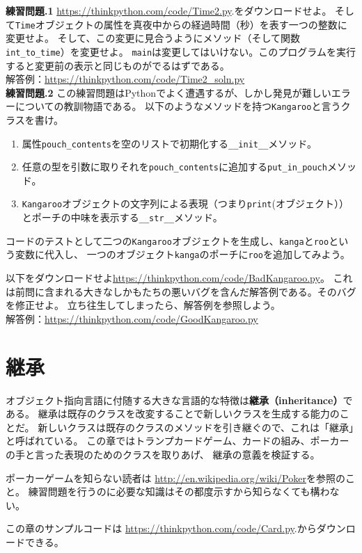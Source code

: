 \documentclass[a4j,12pt,makeidx]{jbook}
\newcommand{\tp}{\thechapter}
\begin{document}
\noindent
{\bf 練習問題\tp.1} \url{https://thinkpython.com/code/Time2.py}.をダウンロードせよ。
そして{\tt Time}オブジェクトの属性を真夜中からの経過時間（秒）を表す一つの整数に変更せよ。
そして、この変更に見合うようにメソッド（そして関数{\tt int\_to\_time}）を変更せよ。
{\tt main}は変更してはいけない。このプログラムを実行すると変更前の表示と同じものがでるはずである。 \\
解答例：\url{https://thinkpython.com/code/Time2_soln.py} \\

\noindent
{\bf 練習問題\tp.2} この練習問題はPythonでよく遭遇するが、しかし発見が難しいエラーについての教訓物語である。
以下のようなメソッドを持つ{\tt Kangaroo}と言うクラスを書け。
\begin{enumerate}
\item 属性{\tt pouch\_contents}を空のリストで初期化する{\verb"__init__"}メソッド。
\item 任意の型を引数に取りそれを{\tt pouch\_contents}に追加する{\tt put\_in\_pouch}メソッド。
\item {\tt Kangaroo}オブジェクトの文字列による表現（つまり{\tt print}(オブジェクト））とポーチの中味を表示する{\verb"__str__"}メソッド。
\end{enumerate}
コードのテストとして二つの{\tt Kangaroo}オブジェクトを生成し、{\tt kanga}と{\tt roo}という変数に代入し、
一つのオブジェクト{\tt kanga}のポーチに{\tt roo}を追加してみよう。\par
以下をダウンロードせよ\url{https://thinkpython.com/code/BadKangaroo.py}。
これは前問に含まれる大きなしかもたちの悪いバグを含んだ解答例である。そのバグを修正せよ。
立ち往生してしまったら、解答例を参照しよう。\\
解答例：\url{https://thinkpython.com/code/GoodKangaroo.py}
%
\chapter{継承}
オブジェクト指向言語に付随する大きな言語的な特徴は{\bf 継承（inheritance）}である。
継承は既存のクラスを改変することで新しいクラスを生成する能力のことだ。
新しいクラスは既存のクラスのメソッドを引き継ぐので、これは「継承」と呼ばれている。
この章ではトランプカードゲーム、カードの組み、ポーカーの手と言った表現のためのクラスを取りあげ、
継承の意義を検証する。\par
ポーカーゲームを知らない読者は 
\url{http://en.wikipedia.org/wiki/Poker}を参照のこと。
練習問題を行うのに必要な知識はその都度示すから知らなくても構わない。\par
この章のサンプルコードは 
\url{https://thinkpython.com/code/Card.py}.からダウンロードできる。
%
\end{document}
